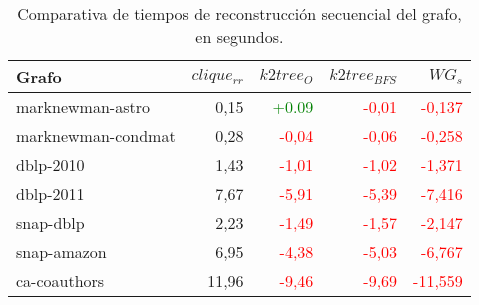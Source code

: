 \begin{table}
	\caption{Comparativa de tiempos de reconstrucción secuencial del grafo, en segundos.}
	\label{table:timesSecuencialDiff}
	\centering
	\begin{tabular}{l|r|r|r|r}
		\toprule
		Grafo & $clique_{rr}$ & $k2tree_{O}$ & $k2tree_{BFS}$ & $WG_{s}$ \\
		\midrule	
		marknewman-astro & 0,15 & \textcolor{Green}{+0.09} & \textcolor{Red}{-0,01} & \textcolor{Red}{-0,137} \\
		marknewman-condmat & 0,28 & \textcolor{Red}{-0,04} & \textcolor{Red}{-0,06} & \textcolor{Red}{-0,258} \\
		dblp-2010 & 1,43 & \textcolor{Red}{-1,01} & \textcolor{Red}{-1,02} & \textcolor{Red}{-1,371} \\
        dblp-2011 & 7,67 & \textcolor{Red}{-5,91} & \textcolor{Red}{-5,39} & \textcolor{Red}{-7,416} \\
		snap-dblp & 2,23 & \textcolor{Red}{-1,49} & \textcolor{Red}{-1,57} & \textcolor{Red}{-2,147} \\
        snap-amazon & 6,95 & \textcolor{Red}{-4,38} & \textcolor{Red}{-5,03} & \textcolor{Red}{-6,767} \\
        ca-coauthors & 11,96 & \textcolor{Red}{-9,46} & \textcolor{Red}{-9,69} & \textcolor{Red}{-11,559} \\
        \bottomrule
	\end{tabular}
\end{table}